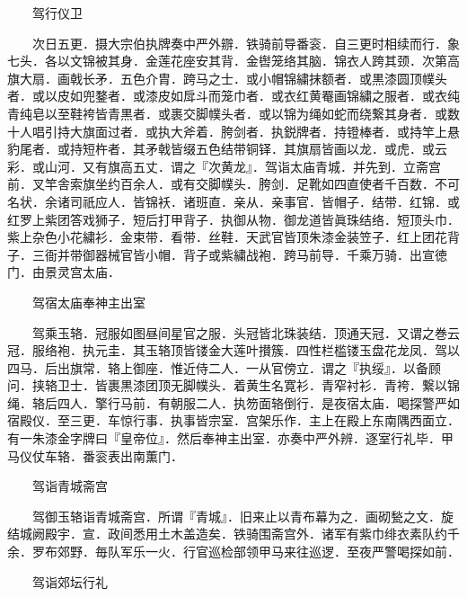 　　驾行仪卫

　　次日五更．摄大宗伯执牌奏中严外辧．铁骑前导番衮．自三更时相续而行．象七头．各以文锦被其身．金莲花座安其背．金辔笼络其脑．锦衣人跨其颈．次第高旗大扇．画戟长矛．五色介胄．跨马之士．或小帽锦繍抹额者．或黒漆圆顶幞头者．或以皮如兜鍪者．或漆皮如戽斗而笼巾者．或衣红黄罨画锦繍之服者．或衣纯青纯皂以至鞋袴皆青黒者．或裹交脚幞头者．或以锦为绳如蛇而绕繋其身者．或数十人唱引持大旗面过者．或执大斧着．胯剑者．执鋭牌者．持镫棒者．或持竿上悬豹尾者．或持短杵者．其矛戟皆缀五色结带铜铎．其旗扇皆画以龙．或虎．或云彩．或山河．又有旗高五丈．谓之『次黄龙』．驾诣太庙青城．并先到．立斋宫前．叉竿舎索旗坐约百余人．或有交脚幞头．胯剑．足靴如四直使者千百数．不可名状．余诸司祇应人．皆锦袄．诸班直．亲从．亲事官．皆帽子．结带．红锦．或红罗上紫团答戏狮子．短后打甲背子．执御从物．御龙道皆眞珠结络．短顶头巾．紫上杂色小花繍衫．金束带．看带．丝鞋．天武官皆顶朱漆金装笠子．红上团花背子．三衙并带御器械官皆小帽．背子或紫繍战袍．跨马前导．千乘万骑．出宣徳门．由景灵宫太庙．

　　驾宿太庙奉神主出室

　　驾乘玉辂．冠服如图昼间星官之服．头冠皆北珠装结．顶通天冠．又谓之巻云冠．服络袍．执元圭．其玉辂顶皆镂金大莲叶攅簇．四性栏槛镂玉盘花龙凤．驾以四马．后出旗常．辂上御座．惟近侍二人．一从官傍立．谓之『执绥』．以备顾问．挟辂卫士．皆裹黒漆团顶无脚幞头．着黄生名寛衫．青窄衬衫．青袴．繋以锦绳．辂后四人．擎行马前．有朝服二人．执笏面辂倒行．是夜宿太庙．喝探警严如宿殿仪．至三更．车惊行事．执事皆宗室．宫架乐作．主上在殿上东南隅西面立．有一朱漆金字牌曰『皇帝位』．然后奉神主出室．亦奏中严外辨．逐室行礼毕．甲马仪仗车辂．番衮表出南薫门．

　　驾诣青城斋宫

　　驾御玉辂诣青城斋宫．所谓『青城』．旧来止以青布幕为之．画砌甃之文．旋结城阙殿宇．宣．政间悉用土木盖造矣．铁骑围斋宫外．诸军有紫巾绯衣素队约千余．罗布郊野．毎队军乐一火．行官巡检部领甲马来往巡逻．至夜严警喝探如前．

　　驾诣郊坛行礼

